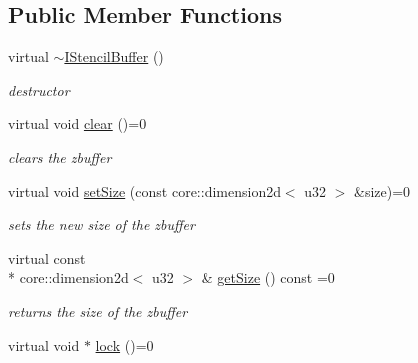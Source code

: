 \subsection*{Public Member Functions}
\begin{DoxyCompactItemize}
\item 
\hypertarget{classirr_1_1video_1_1_i_stencil_buffer_a98145d6c674e3ea4d8e61f0d981465b2}{virtual \hyperlink{classirr_1_1video_1_1_i_stencil_buffer_a98145d6c674e3ea4d8e61f0d981465b2}{$\sim$\-I\-Stencil\-Buffer} ()}\label{classirr_1_1video_1_1_i_stencil_buffer_a98145d6c674e3ea4d8e61f0d981465b2}

\begin{DoxyCompactList}\small\item\em destructor \end{DoxyCompactList}\item 
\hypertarget{classirr_1_1video_1_1_i_stencil_buffer_ae039b36f87e87f07da8e6ce90f1292e6}{virtual void \hyperlink{classirr_1_1video_1_1_i_stencil_buffer_ae039b36f87e87f07da8e6ce90f1292e6}{clear} ()=0}\label{classirr_1_1video_1_1_i_stencil_buffer_ae039b36f87e87f07da8e6ce90f1292e6}

\begin{DoxyCompactList}\small\item\em clears the zbuffer \end{DoxyCompactList}\item 
\hypertarget{classirr_1_1video_1_1_i_stencil_buffer_a48a6ecf715499b5f37d15094f286823b}{virtual void \hyperlink{classirr_1_1video_1_1_i_stencil_buffer_a48a6ecf715499b5f37d15094f286823b}{set\-Size} (const core\-::dimension2d$<$ u32 $>$ \&size)=0}\label{classirr_1_1video_1_1_i_stencil_buffer_a48a6ecf715499b5f37d15094f286823b}

\begin{DoxyCompactList}\small\item\em sets the new size of the zbuffer \end{DoxyCompactList}\item 
\hypertarget{classirr_1_1video_1_1_i_stencil_buffer_ae2d2196233279a060fee230f1b9ebe74}{virtual const \\*
core\-::dimension2d$<$ u32 $>$ \& \hyperlink{classirr_1_1video_1_1_i_stencil_buffer_ae2d2196233279a060fee230f1b9ebe74}{get\-Size} () const =0}\label{classirr_1_1video_1_1_i_stencil_buffer_ae2d2196233279a060fee230f1b9ebe74}

\begin{DoxyCompactList}\small\item\em returns the size of the zbuffer \end{DoxyCompactList}\item 
\hypertarget{classirr_1_1video_1_1_i_stencil_buffer_a1f6aa13a3d073796c5c3d5c24b5b0688}{virtual void $\ast$ \hyperlink{classirr_1_1video_1_1_i_stencil_buffer_a1f6aa13a3d073796c5c3d5c24b5b0688}{lock} ()=0}\label{classirr_1_1video_1_1_i_stencil_buffer_a1f6aa13a3d073796c5c3d5c24b5b0688}


\end{DoxyCompactItemize}
